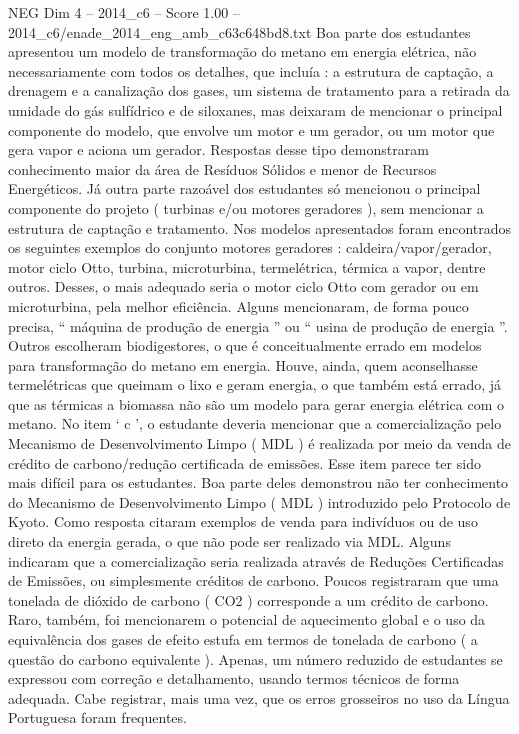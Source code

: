 \begin{textsample}{NEG Dim 4 – 2014\_c6 – Score 1.00 – 2014\_c6/enade\_2014\_eng\_amb\_c63c648bd8.txt}
Boa parte dos estudantes apresentou um modelo de transformação do metano em energia elétrica, não necessariamente com todos os detalhes, que incluía : a estrutura de captação, a drenagem e a canalização dos gases, um sistema de tratamento para a retirada da umidade do gás sulfídrico e de siloxanes, mas deixaram de mencionar o principal componente do modelo, que envolve um motor e um gerador, ou um motor que gera vapor e aciona um gerador.
Respostas desse tipo demonstraram conhecimento maior da área de Resíduos Sólidos e menor de Recursos Energéticos.
Já outra parte razoável dos estudantes só mencionou o principal componente do projeto ( turbinas e/ou motores geradores ), sem mencionar a estrutura de captação e tratamento.
Nos modelos apresentados foram encontrados os seguintes exemplos do conjunto motores geradores : caldeira/vapor/gerador, motor ciclo Otto, turbina, microturbina, termelétrica, térmica a vapor, dentre outros.
Desses, o mais adequado seria o motor ciclo Otto com gerador ou em microturbina, pela melhor eficiência.
Alguns mencionaram, de forma pouco precisa, “ máquina de produção de energia ” ou “ usina de produção de energia ”.
Outros escolheram biodigestores, o que é conceitualmente errado em modelos para transformação do metano em energia.
Houve, ainda, quem aconselhasse termelétricas que queimam o lixo e geram energia, o que também está errado, já que as térmicas a biomassa não são um modelo para gerar energia elétrica com o metano.
No item ‘ c ’, o estudante deveria mencionar que a comercialização pelo Mecanismo de Desenvolvimento Limpo ( MDL ) é realizada por meio da venda de crédito de carbono/redução certificada de emissões.
Esse item parece ter sido mais difícil para os estudantes.
Boa parte deles demonstrou não ter conhecimento do Mecanismo de Desenvolvimento Limpo ( MDL ) introduzido pelo Protocolo de Kyoto.
Como resposta citaram exemplos de venda para indivíduos ou de uso direto da energia gerada, o que não pode ser realizado via MDL.
Alguns indicaram que a comercialização seria realizada através de Reduções Certificadas de Emissões, ou simplesmente créditos de carbono.
Poucos registraram que uma tonelada de dióxido de carbono ( CO2 ) corresponde a um crédito de carbono.
Raro, também, foi mencionarem o potencial de aquecimento global e o uso da equivalência dos gases de efeito estufa em termos de tonelada de carbono ( a questão do carbono equivalente ).
Apenas, um número reduzido de estudantes se expressou com correção e detalhamento, usando termos técnicos de forma adequada.
Cabe registrar, mais uma vez, que os erros grosseiros no uso da Língua Portuguesa foram frequentes.

\end{textsample}
